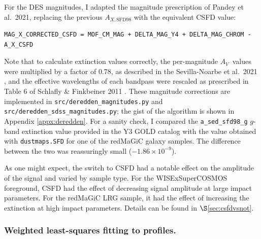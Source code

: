 \documentclass[11pt, oneside]{article}   	%
\newcommand{\av}{$A_V$~}
\newcommand{\ee}[1]{\times 10^{#1}}
\begin{document}
For the DES magnitudes, I adapted the magnitude prescription of Pandey et al.~2021, replacing the previous $A_{X,\mathrm{SFD98}}$ with the equivalent CSFD value: 
\small
\begin{verbatim}
MAG_X_CORRECTED_CSFD = MOF_CM_MAG + DELTA_MAG_Y4 + DELTA_MAG_CHROM - A_X_CSFD
\end{verbatim}
\normalsize

Note that to calculate extinction values correctly, the per-magnitude \av values were multiplied by a factor of 0.78, as described in the Sevilla-Noarbe et al.~2021 \cite{2021ApJS..254...24S}, and the effective wavelengths of each bandpass were rescaled as prescribed in Table 6 of Schlafly \& Finkbeiner 2011 \cite{2011ApJ...737..103S}. These magnitude corrections are implemented in \texttt{src/deredden\_magnitudes.py} and \\
\texttt{src/deredden\_sdss\_magnitudes.py}; the gist of the algorithm is shown in Appendix \ref{appx:deredden}. For a sanity check, I compared the \texttt{a\_sed\_sfd98\_g} $g$-band extinction value provided in the Y3 GOLD catalog with the value obtained with \texttt{dustmaps.SFD} for one of the redMaGiC galaxy samples. The difference between the two was reassuringly small ($-1.86\ee{-9}$). 

As one might expect, the switch to CSFD had a notable effect on the amplitude of the signal and varied by sample type. For the WISExSuperCOSMOS foreground, CSFD had the effect of decreasing signal amplitude at large impact parameters. For the redMaGiC LRG sample, it had the effect of increasing the extinction at high impact parameters. Details can be found in $\S$\ref{sec:csfdvsnot}.  

\subsubsection{Weighted least-squares fitting to profiles.}
\end{document}
